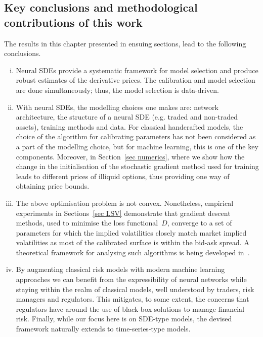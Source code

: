 
\subsection{Key conclusions and methodological contributions of this work}
The results in this chapter presented in ensuing sections, lead to the following conclusions. 
\begin{enumerate}[i)]
\item Neural SDEs provide a systematic framework for model selection and produce robust estimates of the derivative prices. 
The calibration and model selection are done simultaneously; thus, the model selection is data-driven. 
\item With neural SDEs, the modelling choices one makes are: network architecture, the structure of a neural SDE (e.g. traded and non-traded assets), training methods and data. 
For classical handcrafted models, the choice of the algorithm for calibrating parameters has not been considered as a part of the modelling choice, but for machine learning, this is one of the key components. 
Moreover, in Section~\ref{sec numerics}, where we show how the change in the initialisation of the stochastic gradient method used for training leads to different prices of illiquid options, thus providing one way of obtaining price bounds.

\item The above optimisation problem is not convex. 
Nonetheless, empirical experiments in Sections~\ref{sec LSV} demonstrate that gradient descent methods, used to minimise the loss functional~$D$, converge to a set of parameters for which the implied volatilities closely match market implied volatilities as most of the calibrated surface is within the bid-ask spread. 
A theoretical framework for analysing such algorithms is being developed in~\cite{Siska2020GradientProblems}.

\item By augmenting classical risk models with modern machine learning approaches we can benefit from the expressibility of neural networks while staying within the realm of classical models, well understood by traders, risk managers and regulators. 
This mitigates, to some extent, the concerns that regulators have around the use of black-box solutions to manage financial risk.
Finally, while our focus here is on SDE-type models, the devised framework naturally extends to time-series-type models.
\end{enumerate}
